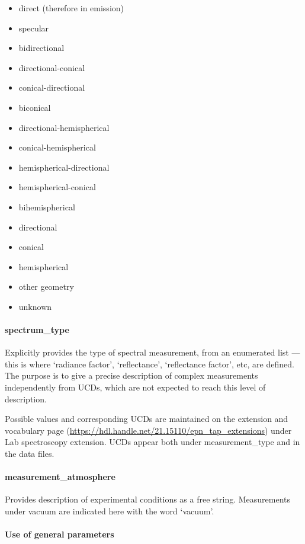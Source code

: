 \documentclass[11pt,a4paper]{ivoa}
\begin{document}
\begin{itemize}
\item direct (therefore in emission)
\item specular
\item bidirectional
\item directional-conical
\item conical-directional
\item biconical
\item directional-hemispherical
\item conical-hemispherical
\item hemispherical-directional
\item hemispherical-conical
\item bihemispherical
\item directional
\item conical
\item hemispherical
\item other geometry
\item unknown
\end{itemize}

\paragraph{spectrum\_type}

Explicitly provides the type of spectral measurement, from an enumerated
list --- this is where `radiance factor', `reflectance', `reflectance
factor', etc, are defined. The purpose is to give a precise description
of complex measurements independently from UCDs, which are not expected
to reach this level of description.

Possible values and corresponding UCDs are maintained on the extension and
vocabulary page (\url{https://hdl.handle.net/21.15110/epn_tap_extensions})
under Lab spectroscopy extension. UCDs appear both under
measurement\_type and in the data files.


\paragraph{measurement\_atmosphere}

Provides description of experimental conditions as a free string.
Measurements under vacuum are indicated here with the word `vacuum'.

\paragraph{Use of general parameters}
\end{document}
